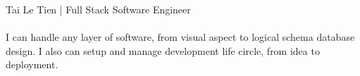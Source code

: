 {\Huge Tai Le Tien} | Full Stack Software Engineer\\
\\
I can handle any layer of software, from visual aspect to logical schema
database design. I also can setup and manage development life circle, from
idea to deployment.\\
